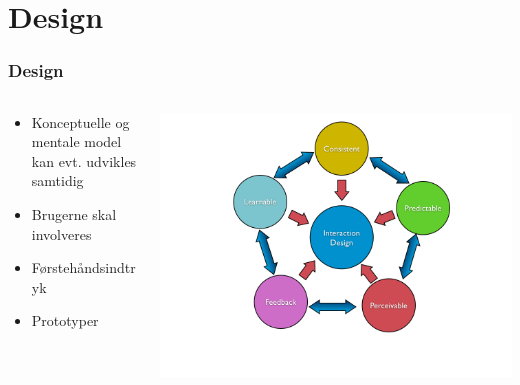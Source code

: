 \documentclass{beamer}
\begin{document}
\section{Design}
\begin{frame}
  \frametitle{Design}
  \begin{columns}[T]
    \begin{column}{0.5\textwidth}
      \begin{itemize}
	    \item Konceptuelle og mentale model kan evt. udvikles samtidig
	    \item Brugerne skal involveres
	    \item Førstehåndsindtryk
	    \item Prototyper
      \end{itemize}  
    \end{column}
    \begin{column}{.5\textwidth}
      \includegraphics[width=\textwidth]{design.png}
    \end{column}
  \end{columns}
\end{frame}
\end{document}
